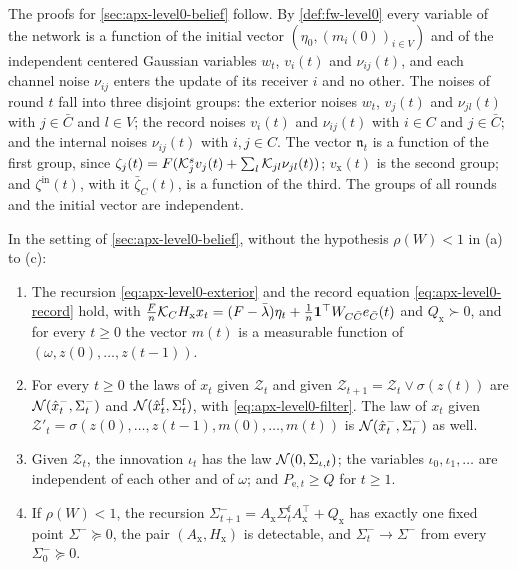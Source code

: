 The proofs for \cref{sec:apx-level0-belief} follow. By \cref{def:fw-level0} every variable of the network is a function of the initial vector $(\eta_0,(m_i(0))_{i\in V})$ and of the independent centered Gaussian variables $w_t$, $v_i(t)$ and $\nu_{ij}(t)$, and each channel noise $\nu_{ij}$ enters the update of its receiver $i$ and no other. The noises of round $t$ fall into three disjoint groups: the exterior noises $w_t$, $v_j(t)$ and $\nu_{jl}(t)$ with $j\in\bar C$ and $l\in V$; the record noises $v_i(t)$ and $\nu_{ij}(t)$ with $i\in C$ and $j\in\bar C$; and the internal noises $\nu_{ij}(t)$ with $i,j\in C$. The vector $\mathfrak n_t$ is a function of the first group, since $\zeta_j(t)=F(\mathcal{K}^s_jv_j(t)+\sum_l\mathcal{K}_{jl}\nu_{jl}(t))$; $v_{\mathrm x}(t)$ is the second group; and $\zeta^{\mathrm{in}}(t)$, with it $\bar\zeta_C(t)$, is a function of the third. The groups of all rounds and the initial vector are independent.

\begin{lemma}\label{lem:apx-level0-separation}
In the setting of \cref{sec:apx-level0-belief}, without the hypothesis $\rho(W)<1$ in (a) to (c):
\begin{enumerate}
\item[(a)] The recursion \eqref{eq:apx-level0-exterior} and the record equation \eqref{eq:apx-level0-record} hold, with $\frac Fn\mathcal{K}_CH_{\mathrm x}x_t=(F-\bar\lambda)\eta_t+\frac1n\mathbf{1}^\top W_{C\bar C}e_{\bar C}(t)$ and $Q_{\mathrm x}\succ0$, and for every $t\ge0$ the vector $m(t)$ is a measurable function of $(\omega,z(0),\dots,z(t-1))$.
\item[(b)] For every $t\ge0$ the laws of $x_t$ given $\mathcal Z_t$ and given $\mathcal Z_{t+1}=\mathcal Z_t\vee\sigma(z(t))$ are $\mathcal{N}(\hat x^-_t,\Sigma^-_t)$ and $\mathcal{N}(\hat x^{\mathrm f}_t,\Sigma^{\mathrm f}_t)$, with \eqref{eq:apx-level0-filter}. The law of $x_t$ given $\mathcal Z'_t=\sigma(z(0),\dots,z(t-1),m(0),\dots,m(t))$ is $\mathcal{N}(\hat x^-_t,\Sigma^-_t)$ as well.
\item[(c)] Given $\mathcal Z_t$, the innovation $\iota_t$ has the law $\mathcal{N}(0,\Sigma_{\iota,t})$; the variables $\iota_0,\iota_1,\dots$ are independent of each other and of $\omega$; and $P_{\mathrm e,t}\ge Q$ for $t\ge1$.
\item[(d)] If $\rho(W)<1$, the recursion $\Sigma^-_{t+1}=A_{\mathrm x}\Sigma^{\mathrm f}_tA_{\mathrm x}^\top+Q_{\mathrm x}$ has exactly one fixed point $\Sigma^-\succeq0$, the pair $(A_{\mathrm x},H_{\mathrm x})$ is detectable, and $\Sigma^-_t\to\Sigma^-$ from every $\Sigma^-_0\succeq0$.
\end{enumerate}
\end{lemma}

